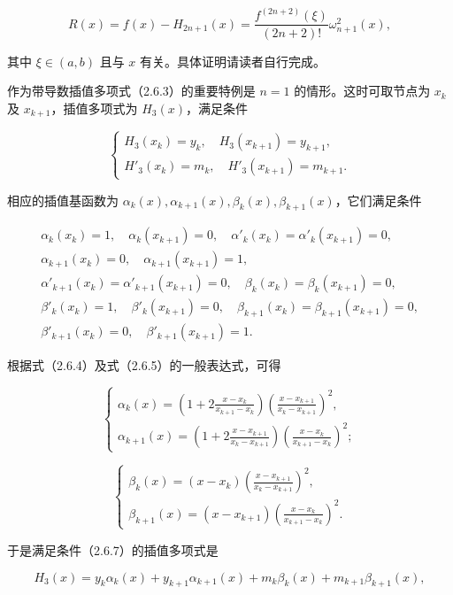 \[R(x)=f(x)-H_{2n+1}(x)=\frac{f^{(2n+2)}(\xi)}{(2n+2)!}\omega_{n+1}^2(x),\tag{2.6.6}\]

其中 \(\xi\in(a,b)\) 且与 \(x\) 有关。具体证明请读者自行完成。

作为带导数插值多项式（2.6.3）的重要特例是 \(n=1\) 的情形。这时可取节点为 \(x_k\) 及 \(x_{k+1}\)，插值多项式为 \(H_3(x)\)，满足条件

\[\begin{cases}
H_3(x_k)=y_k,\quad H_3(x_{k+1})=y_{k+1},\\
H'_3(x_k)=m_k,\quad H'_3(x_{k+1})=m_{k+1}.
\end{cases}\tag{2.6.7}\]

相应的插值基函数为 \(\alpha_k(x),\alpha_{k+1}(x),\beta_k(x),\beta_{k+1}(x)\)，它们满足条件

\[\begin{gathered}
\alpha_k(x_k)=1,\quad\alpha_k(x_{k+1})=0,\quad\alpha'_k(x_k)=\alpha'_k(x_{k+1})=0,\\
\alpha_{k+1}(x_k)=0,\quad\alpha_{k+1}(x_{k+1})=1,\\
\alpha'_{k+1}(x_k)=\alpha'_{k+1}(x_{k+1})=0,\quad\beta_k(x_k)=\beta_k(x_{k+1})=0,\\
\beta'_k(x_k)=1,\quad\beta'_k(x_{k+1})=0,\quad\beta_{k+1}(x_k)=\beta_{k+1}(x_{k+1})=0,\\
\beta'_{k+1}(x_k)=0,\quad\beta'_{k+1}(x_{k+1})=1.
\end{gathered}\]

根据式（2.6.4）及式（2.6.5）的一般表达式，可得

\[\begin{cases}
\displaystyle\alpha_k(x)=\left(1+2\frac{x-x_k}{x_{k+1}-x_k}\right)\left(\frac{x-x_{k+1}}{x_k-x_{k+1}}\right)^2,\\[6pt]
\displaystyle\alpha_{k+1}(x)=\left(1+2\frac{x-x_{k+1}}{x_k-x_{k+1}}\right)\left(\frac{x-x_k}{x_{k+1}-x_k}\right)^2;
\end{cases}\tag{2.6.8}\]

\[\begin{cases}
\displaystyle\beta_k(x)=(x-x_k)\left(\frac{x-x_{k+1}}{x_k-x_{k+1}}\right)^2,\\[6pt]
\displaystyle\beta_{k+1}(x)=(x-x_{k+1})\left(\frac{x-x_k}{x_{k+1}-x_k}\right)^2.
\end{cases}\tag{2.6.9}\]

于是满足条件（2.6.7）的插值多项式是

\[H_3(x)=y_k\alpha_k(x)+y_{k+1}\alpha_{k+1}(x)+m_k\beta_k(x)+m_{k+1}\beta_{k+1}(x),\tag{2.6.10}\]

